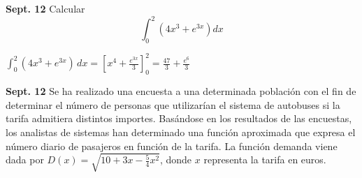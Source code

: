 \documentclass[addpoints,spanish, 12pt,a4paper]{exam}
\begin{document}
\begin{questions}

\question[2] \textbf{Sept. 12} Calcular $$\int_0^2 (4x^3+e^{3x}) dx$$
\begin{solution}
$\int_{0}^{2} \left(4 x^{3} + e^{3 x}\right)\, dx=\left[x^{4} + \frac{e^{3 x}}{3}\right]_{0}^2=\frac{47}{3} + \frac{e^{6}}{3}$
\end{solution}

\question    \textbf{Sept. 12} Se ha realizado una encuesta a una determinada población con el fin de determinar el número de personas que utilizarían el sistema de autobuses si la tarifa admitiera distintos importes. Basándose en los resultados de las encuestas, los analistas de sistemas han determinado una función aproximada que expresa el número diario de pasajeros en función de la tarifa. La función demanda viene dada por $D(x)=\sqrt{10+3x-\frac{5}{4}x^2} $, donde $x$ representa la tarifa en euros.


\begin{parts}

\end{parts}
\end{questions}
\end{document}
